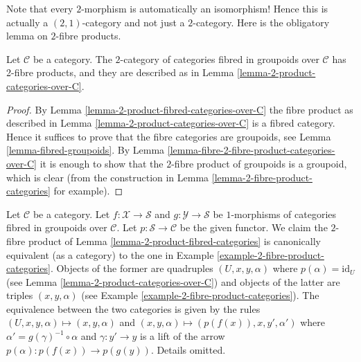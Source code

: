 \noindent
Note that every $2$-morphism is automatically an isomorphism!
Hence this is actually a $(2, 1)$-category and not just a
$2$-category. Here is the obligatory lemma on $2$-fibre products.

\begin{lemma}
\label{lemma-2-product-fibred-categories}
Let $\mathcal{C}$ be a category.
The $2$-category of categories fibred in groupoids
over $\mathcal{C}$ has 2-fibre products, and they are described as in
Lemma \ref{lemma-2-product-categories-over-C}.
\end{lemma}

\begin{proof}
By Lemma \ref{lemma-2-product-fibred-categories-over-C}
the fibre product as described in
Lemma \ref{lemma-2-product-categories-over-C} is a fibred category.
Hence it suffices to prove that the fibre categories are
groupoids, see Lemma \ref{lemma-fibred-groupoids}.
By Lemma \ref{lemma-fibre-2-fibre-product-categories-over-C}
it is enough to show that the $2$-fibre product of groupoids
is a groupoid, which is clear (from the construction in
Lemma \ref{lemma-2-fibre-product-categories} for example).
\end{proof}

\begin{remark}
\label{remark-2-product-fibred-categories-same}
Let $\mathcal{C}$ be a category. Let $f : \mathcal{X} \to \mathcal{S}$
and $g : \mathcal{Y} \to \mathcal{S}$ be $1$-morphisms of
categories fibred in groupoids over $\mathcal{C}$.
Let $p : \mathcal{S} \to \mathcal{C}$ be the given functor.
We claim the $2$-fibre product of Lemma \ref{lemma-2-product-fibred-categories}
is canonically equivalent (as a category) to the one in
Example \ref{example-2-fibre-product-categories}.
Objects of the former are quadruples $(U, x, y, \alpha)$
where $p(\alpha) = \text{id}_U$
(see Lemma \ref{lemma-2-product-categories-over-C})
and objects of the latter are triples $(x, y, \alpha)$ (see
Example \ref{example-2-fibre-product-categories}).
The equivalence between the two categories is given by
the rules $(U, x, y, \alpha) \mapsto (x, y, \alpha)$
and $(x, y, \alpha) \mapsto (p(f(x)), x, y', \alpha')$
where $\alpha' = g(\gamma)^{-1} \circ \alpha$ and $\gamma : y' \to y$
is a lift of the arrow $p(\alpha) : p(f(x)) \to p(g(y))$.
Details omitted.
\end{remark}

